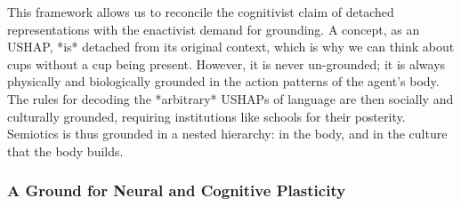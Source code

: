 This framework allows us to reconcile the cognitivist claim of detached representations with the enactivist demand for grounding. A concept, as an USHAP, *is* detached from its original context, which is why we can think about cups without a cup being present. However, it is never un-grounded; it is always physically and biologically grounded in the action patterns of the agent's body. The rules for decoding the *arbitrary* USHAPs of language are then socially and culturally grounded, requiring institutions like schools for their posterity. Semiotics is thus grounded in a nested hierarchy: in the body, and in the culture that the body builds.

\subsubsection*{A Ground for Neural and Cognitive Plasticity}
